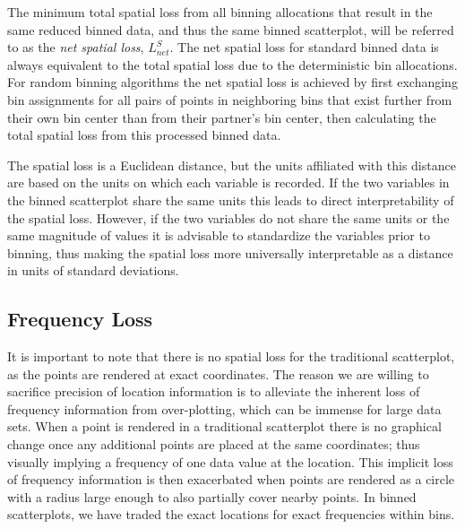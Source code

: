\documentclass[11pt]{isuthesis}\usepackage[]{graphicx}\usepackage[]{color}
\begin{document}
The minimum total spatial loss from all binning allocations that result in the same reduced binned data, and thus the same binned scatterplot, will be referred to as the \textit{net spatial loss}, $L^S_{net}$. The net spatial loss for standard binned data is always  equivalent to the total spatial loss due to the deterministic bin allocations. For random binning algorithms the net spatial loss is achieved by first exchanging bin assignments for all pairs of points in neighboring bins that exist further from their own bin center than from their partner's bin center, then calculating the total spatial loss from this processed binned data. 

The spatial loss is a Euclidean distance, but the units affiliated with this distance are based on the units on which each variable is recorded. If the two variables in the binned scatterplot share the same units this leads to direct interpretability of the spatial loss.  However, if the two variables do not share the same units or the same magnitude of values it is advisable to standardize the variables prior to binning, thus making the spatial loss more universally interpretable as a distance in units of standard deviations. 


\subsection{Frequency Loss}
\label{FreqLoss}

It is important to note that there is no spatial loss for the traditional scatterplot, as the points are rendered at exact coordinates. The reason we are willing to sacrifice precision of location information is to alleviate the inherent loss of frequency information from over-plotting, which can be immense for large data sets. When a point is rendered in a traditional scatterplot there is no graphical change once any additional points are placed at the same coordinates; thus visually implying a frequency of one data value at the location. This implicit loss of frequency information is then exacerbated when points are rendered as a circle with a radius large enough to also partially cover nearby points. In binned scatterplots, we have traded the exact locations for exact frequencies within bins. 
\end{document}
